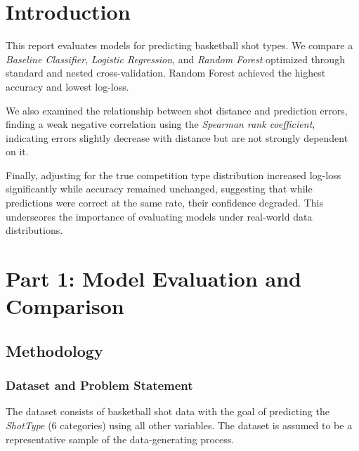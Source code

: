 \documentclass[fleqn,moreauthors,10pt]{ds_report}
\begin{document}
%
\raggedbottom

\maketitle

\thispagestyle{empty} 


\section*{Introduction}

This report evaluates models for predicting basketball shot types. We compare a \textit{Baseline Classifier}, \textit{Logistic Regression}, and \textit{Random Forest} optimized through standard and nested cross-validation. Random Forest achieved the highest accuracy and lowest log-loss.

We also examined the relationship between shot distance and prediction errors, finding a weak negative correlation using the \textit{Spearman rank coefficient}, indicating errors slightly decrease with distance but are not strongly dependent on it.

Finally, adjusting for the true competition type distribution increased log-loss significantly while accuracy remained unchanged, suggesting that while predictions were correct at the same rate, their confidence degraded. This underscores the importance of evaluating models under real-world data distributions.

\section*{Part 1: Model Evaluation and Comparison}

\subsection*{Methodology}

\subsubsection*{Dataset and Problem Statement}
The dataset consists of basketball shot data with the goal of predicting the \textit{ShotType} (6 categories) using all other variables. The dataset is assumed to be a representative sample of the data-generating process.
\end{document}
